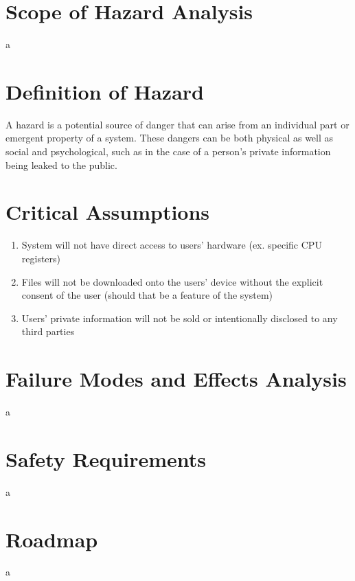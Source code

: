 \documentclass[12pt]{article}
\begin{document}
\section{Scope of Hazard Analysis}
a

\section{Definition of Hazard}
A hazard is a potential source of danger that can arise from an individual part or emergent property of a system. These dangers can be both physical as well as social and psychological, such as in the case of a person's private information being leaked to the public.

\section{Critical Assumptions}
\begin{enumerate}
	\item System will not have direct access to users' hardware (ex. specific CPU registers)
	\item Files will not be downloaded onto the users' device without the explicit consent of the user (should that be a feature of the system)
	\item Users' private information will not be sold or intentionally disclosed to any third parties
\end{enumerate}

\section{Failure Modes and Effects Analysis}
a

\section{Safety Requirements}
a

\section{Roadmap}
a
\end{document}
